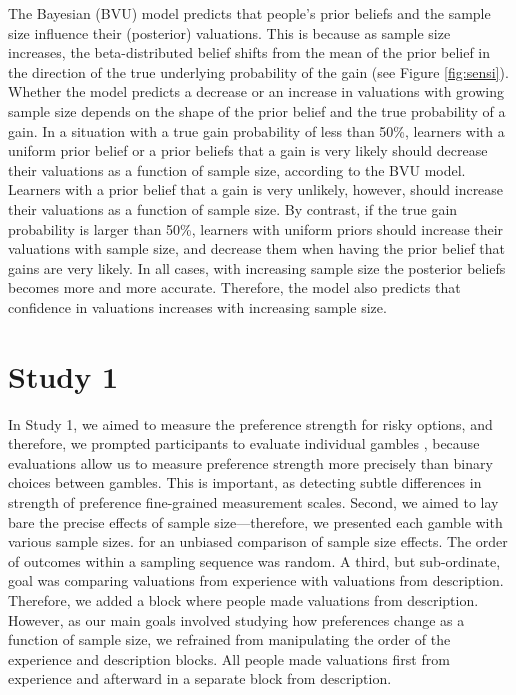 \documentclass[a4paper, man, natbib, floatsintext]{apa6}
\begin{document}
The Bayesian (BVU) model predicts that people's prior beliefs and the sample size influence their (posterior) valuations. This is because as sample size increases, the beta-distributed belief shifts from the mean of the prior belief in the direction of the true underlying probability of the gain (see Figure \ref{fig:sensi}). Whether the model predicts a decrease or an increase in valuations with growing sample size depends on the shape of the prior belief and the true probability of a gain. In a situation with a true gain probability of less than 50\%, learners with a uniform prior belief or a prior beliefs that a gain is very likely should decrease their valuations as a function of sample size, according to the BVU model. Learners with a prior belief that a gain is very unlikely, however, should increase their valuations as a function of sample size. By contrast, if the true gain probability is larger than 50\%, learners with uniform priors should increase their valuations with sample size, and decrease them when having the prior belief that gains are very likely. In all cases, with increasing sample size the posterior beliefs becomes more and more accurate. Therefore, the model also predicts that confidence in valuations increases with increasing sample size. %

\section{Study 1}
In Study 1, we aimed to measure the preference strength for risky options, and therefore, we prompted participants to evaluate individual gambles \citep[similer to e.g.,][]{Ashby2014, Golan2014, Pachur2012}, because evaluations allow us to measure preference strength more precisely than binary choices between gambles. This is important, as detecting subtle differences in strength of preference  fine-grained measurement scales.  Second, we aimed to lay bare the precise effects of sample size---therefore, we presented each gamble with various sample sizes.  for an unbiased comparison of sample size effects. The order of outcomes within a sampling sequence was random. A third, but sub-ordinate, goal was comparing valuations from experience with valuations from description. Therefore, we added a block where people made valuations from description. However, as our main goals involved studying how preferences change as a function of sample size, we refrained from manipulating the order of the experience and description blocks. All people made valuations first from experience and afterward in a separate block from description. 
\end{document}
